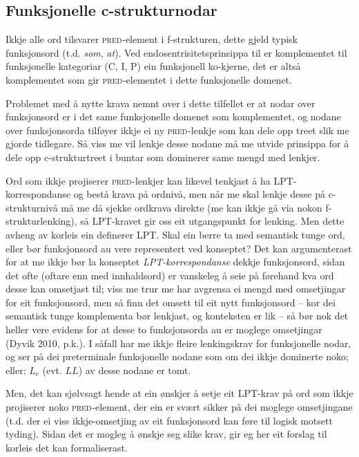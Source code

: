 \documentclass[12pt,a4paper,oneside,draft]{report}
\newcommand{\F}[2]{\textsc{#1}\ensuremath{_{#2}}}
\newcommand{\PRED}{\F{pred}{}}
\begin{document}
\subsection{Funksjonelle c\hyp{}strukturnodar}
\label{sec-3.7.3}

\label{SEC:fnord}

Ikkje alle ord tilsvarer \PRED{}-element i f\hyp{}strukturen, dette gjeld
 typisk funksjonsord (t.d. \emph{som}, \emph{at}). Ved endosentrisitetsprinsippa
 til \citet{bresnan2001lfs} er komplementet til funksjonelle
 kategoriar (C, I, P) ein funksjonell ko-kjerne, det er altså
 komplementet som gir \PRED{}-elementet i dette funksjonelle domenet.

Problemet med å nytte krava nemnt over i dette tilfellet er at nodar
 over funksjonsord er i det same funksjonelle domenet som
 komplementet, og nodane over funksjonsorda tilføyer ikkje ei ny
 \PRED{}-lenkje som kan dele opp treet slik me gjorde tidlegare. Så
 viss me vil lenkje desse nodane må me utvide prinsippa for å dele opp
 c\hyp{}strukturtreet i buntar som dominerer same mengd med lenkjer.

Ord som ikkje projiserer \PRED{}-lenkjer kan likevel tenkjast å ha
 LPT\hyp{}korrespondanse og bestå krava på ordnivå, men når me skal lenkje
 desse på c\hyp{}strukturnivå må me då sjekke ordkrava direkte (me kan
 ikkje gå via nokon f\hyp{}strukturlenking), så LPT-kravet gir oss eit
 utgangspunkt for lenking. Men dette avheng av korleis ein definerer
 LPT. Skal ein berre ta med semantisk tunge ord, eller bør
 funksjonsord au vere representert ved konseptet? Det kan
 argumenterast for at me ikkje bør la konseptet \emph{LPT\hyp{}korrespondanse}
 dekkje funksjonsord, sidan det ofte (oftare enn med innhaldsord) er
 vanskeleg å seie på førehand kva ord desse kan omsetjast til; viss me
 trur me har avgrensa ei mengd med omsetjingar for eit funksjonsord,
 men så finn det omsett til eit nytt funksjonsord -- kor dei semantisk
 tunge komplementa bør lenkjast, og konteksten er lik -- så bør nok
 det heller vere evidens for at desse to funksjonsorda au er moglege
 omsetjingar (Dyvik 2010, p.k.).  I såfall har me ikkje fleire
 lenkingskrav for funksjonelle nodar, og ser på dei preterminale
 funksjonelle nodane som om dei ikkje dominerte noko; eller: $L_c$
 (evt. $LL$) av desse nodane er tomt.

Men, det kan sjølvsagt hende at ein ønskjer å setje eit LPT-krav på
 ord som ikkje projiserer noko \PRED{}-element, der ein er svært
 sikker på dei moglege omsetjingane (t.d. der ei viss ikkje-omsetjing
 av eit funksjonsord kan føre til logisk motsett tyding). Sidan det er
 mogleg å ønskje seg slike krav, gir eg her eit forslag til korleis
 det kan formaliserast.
\end{document}

